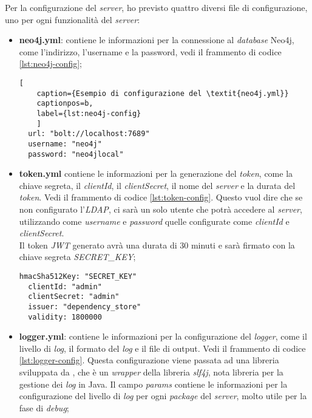 Per la configurazione del \textit{server}, ho previsto quattro diversi file di configurazione, uno per ogni funzionalità del \textit{server}:
\begin{itemize}
  \item \textbf{neo4j.yml}: contiene le informazioni per la connessione al \textit{database} Neo4j, come l'indirizzo, l'username e la password, vedi il frammento di codice \ref*{lst:neo4j-config};
  \begin{lstlisting}[
    caption={Esempio di configurazione del \textit{neo4j.yml}}
    captionpos=b, 
    label={lst:neo4j-config}
    ]
  url: "bolt://localhost:7689"
  username: "neo4j"
  password: "neo4jlocal"
  \end{lstlisting}
  \item \textbf{token.yml} contiene le informazioni per la generazione del \textit{token}, come la chiave segreta, il \textit{clientId}, il \textit{clientSecret}, il
    nome del \textit{server} e la durata del \textit{token}. Vedi il frammento di codice \ref*{lst:token-config}.
    Questo vuol dire che se non configurato l'\textit{LDAP}, ci sarà un solo utente che potrà accedere al \textit{server}, 
    utilizzando come \textit{username} e \textit{password} quelle configurate come \textit{clientId} e \textit{clientSecret}.\\
    Il token \textit{JWT} generato avrà una durata di 30 minuti e sarà firmato con la chiave segreta \textit{SECRET\_KEY};
    \begin{lstlisting}[caption={Esempio di configurazione del \textit{token.yml}.},captionpos=b, label={lst:token-config}]
  hmacSha512Key: "SECRET_KEY"
  clientId: "admin"
  clientSecret: "admin"
  issuer: "dependency_store"
  validity: 1800000
    \end{lstlisting}
  \item \textbf{logger.yml}: contiene le informazioni per la configurazione del \textit{logger}, come il livello di \textit{log}, il formato del \textit{log} e il file di output. Vedi il frammento di codice \ref*{lst:logger-config}.
    Questa configurazione viene passata ad una libreria sviluppata da \azienda{}, che è un \textit{wrapper} della libreria \textit{slf4j}, nota libreria per la gestione dei \textit{log} in Java.
    Il campo \textit{params} contiene le informazioni per la configurazione del livello di \textit{log} per ogni \textit{package} del \textit{server}, molto utile per la fase di \textit{debug};
    \begin{lstlisting}[caption={Esempio di configurazione del \textit{logger.yml}.},captionpos=b, label={lst:logger-config}]

\end{lstlisting}
\end{itemize}
